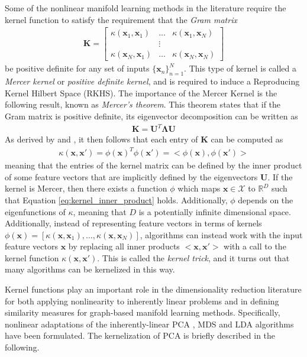 Some of the nonlinear manifold learning methods in the literature require the kernel function to satisfy the requirement that the \textit{Gram matrix}
\begin{align}
	\bm{K} = 	
	\begin{bmatrix}
		\kappa(\bm{x}_{1},\bm{x}_{1}) &  \dots & \kappa(\bm{x}_{1},\bm{x}_{N}) \\
		 & \vdots  & \\
		\kappa(\bm{x}_{N},\bm{x}_{1}) & \dots & \kappa(\bm{x}_{N},\bm{x}_{N})
	\end{bmatrix}
\end{align}
\noindent
be positive definite for any set of inputs $\{\bm{x}_{n}\}_{n=1}^{N}$.  This type of kernel is called a \textit{Mercer kernel} or \textit{positive definite kernel}, and is required to induce a Reproducing Kernel Hilbert Space (RKHS).  The importance of the Mercer Kernel is the following result, known as \textit{Mercer's theorem}.  This theorem states that if the Gram matrix is positive definite, its eigenvector decomposition can be written as
\begin{align}
	\bm{K} = \bm{U}^{T}\bm{\Lambda}\bm{U}
\end{align}
As derived by \cite{Murphy2012} and \cite{Liu2010KernelAdaptiveFiltering}, it then follows that each entry of $\bm{K}$ can be computed as 
\begin{align}
	\kappa(\bm{x},\bm{x}') = \phi(\bm{x})^{T}\phi(\bm{x}') = <\phi(\bm{x}),\phi(\bm{x}')>
	\label{eq:kernel_inner_product}
\end{align}
meaning that the entries of the kernel matrix can be defined by the inner product of some feature vectors that are implicitly defined by the eigenvectors $\bm{U}$.  If the kernel is Mercer, then there exists a function $\phi$ which maps $\bm{x} \in \mathcal{X}$ to $\mathbb{R}^{D}$ such that Equation \ref{eq:kernel_inner_product} holds.  Additionally, $\phi$ depends on the eigenfunctions of $\kappa$, meaning that $D$ is a potentially infinite dimensional space.
Additionally, instead of representing feature vectors in terms of kernels $\phi(\bm{x}) = [\kappa(\bm{x},\bm{x}_{1}), \dots, \kappa(\bm{x},\bm{x}_{N})]$, algorithms can instead work with the input feature vectors $\bm{x}$ by replacing all inner products $<\bm{x},\bm{x}'>$ with a call to the kernel function $\kappa(\bm{x},\bm{x}')$.  This is called the \textit{kernel trick}, and it turns out that many algorithms can be kernelized in this way.

Kernel functions play an important role in the dimensionality reduction literature for both applying nonlinearity to inherently linear problems and in defining similarity measures for graph-based manifold learning methods.  Specifically, nonlinear adaptations of the inherently-linear PCA \citep{Scholkopf1999KPCA}, MDS \citep{Webb2002KMDS} and LDA \citep{Ghojogh2019KDATutorial} algorithms have been formulated. The kernelization of PCA is briefly described in the following. 

